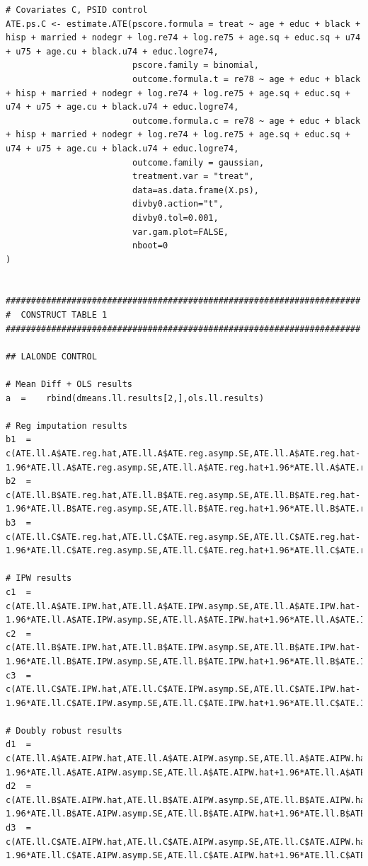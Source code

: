 \documentclass[12pt]{article}
\begin{document}
\begin{verbatim}
# Covariates C, PSID control
ATE.ps.C <- estimate.ATE(pscore.formula = treat ~ age + educ + black + hisp + married + nodegr + log.re74 + log.re75 + age.sq + educ.sq + u74 + u75 + age.cu + black.u74 + educ.logre74,
                         pscore.family = binomial,
                         outcome.formula.t = re78 ~ age + educ + black + hisp + married + nodegr + log.re74 + log.re75 + age.sq + educ.sq + u74 + u75 + age.cu + black.u74 + educ.logre74,
                         outcome.formula.c = re78 ~ age + educ + black + hisp + married + nodegr + log.re74 + log.re75 + age.sq + educ.sq + u74 + u75 + age.cu + black.u74 + educ.logre74,
                         outcome.family = gaussian,
                         treatment.var = "treat",
                         data=as.data.frame(X.ps),
                         divby0.action="t",
                         divby0.tol=0.001,
                         var.gam.plot=FALSE,
                         nboot=0
)


######################################################################
#  CONSTRUCT TABLE 1
######################################################################

## LALONDE CONTROL

# Mean Diff + OLS results
a  =    rbind(dmeans.ll.results[2,],ols.ll.results)

# Reg imputation results
b1  =   c(ATE.ll.A$ATE.reg.hat,ATE.ll.A$ATE.reg.asymp.SE,ATE.ll.A$ATE.reg.hat-1.96*ATE.ll.A$ATE.reg.asymp.SE,ATE.ll.A$ATE.reg.hat+1.96*ATE.ll.A$ATE.reg.asymp.SE)
b2  =   c(ATE.ll.B$ATE.reg.hat,ATE.ll.B$ATE.reg.asymp.SE,ATE.ll.B$ATE.reg.hat-1.96*ATE.ll.B$ATE.reg.asymp.SE,ATE.ll.B$ATE.reg.hat+1.96*ATE.ll.B$ATE.reg.asymp.SE)
b3  =   c(ATE.ll.C$ATE.reg.hat,ATE.ll.C$ATE.reg.asymp.SE,ATE.ll.C$ATE.reg.hat-1.96*ATE.ll.C$ATE.reg.asymp.SE,ATE.ll.C$ATE.reg.hat+1.96*ATE.ll.C$ATE.reg.asymp.SE)

# IPW results
c1  =   c(ATE.ll.A$ATE.IPW.hat,ATE.ll.A$ATE.IPW.asymp.SE,ATE.ll.A$ATE.IPW.hat-1.96*ATE.ll.A$ATE.IPW.asymp.SE,ATE.ll.A$ATE.IPW.hat+1.96*ATE.ll.A$ATE.IPW.asymp.SE)
c2  =   c(ATE.ll.B$ATE.IPW.hat,ATE.ll.B$ATE.IPW.asymp.SE,ATE.ll.B$ATE.IPW.hat-1.96*ATE.ll.B$ATE.IPW.asymp.SE,ATE.ll.B$ATE.IPW.hat+1.96*ATE.ll.B$ATE.IPW.asymp.SE)
c3  =   c(ATE.ll.C$ATE.IPW.hat,ATE.ll.C$ATE.IPW.asymp.SE,ATE.ll.C$ATE.IPW.hat-1.96*ATE.ll.C$ATE.IPW.asymp.SE,ATE.ll.C$ATE.IPW.hat+1.96*ATE.ll.C$ATE.IPW.asymp.SE)

# Doubly robust results
d1  =   c(ATE.ll.A$ATE.AIPW.hat,ATE.ll.A$ATE.AIPW.asymp.SE,ATE.ll.A$ATE.AIPW.hat-1.96*ATE.ll.A$ATE.AIPW.asymp.SE,ATE.ll.A$ATE.AIPW.hat+1.96*ATE.ll.A$ATE.AIPW.asymp.SE)
d2  =   c(ATE.ll.B$ATE.AIPW.hat,ATE.ll.B$ATE.AIPW.asymp.SE,ATE.ll.B$ATE.AIPW.hat-1.96*ATE.ll.B$ATE.AIPW.asymp.SE,ATE.ll.B$ATE.AIPW.hat+1.96*ATE.ll.B$ATE.AIPW.asymp.SE)
d3  =   c(ATE.ll.C$ATE.AIPW.hat,ATE.ll.C$ATE.AIPW.asymp.SE,ATE.ll.C$ATE.AIPW.hat-1.96*ATE.ll.C$ATE.AIPW.asymp.SE,ATE.ll.C$ATE.AIPW.hat+1.96*ATE.ll.C$ATE.AIPW.asymp.SE)


\end{verbatim}
\end{document}
